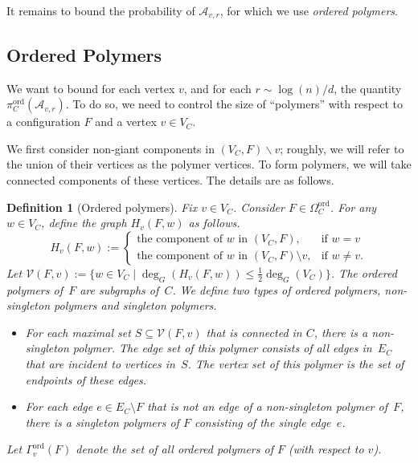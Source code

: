 \documentclass[11pt]{article}
\theoremstyle{plain}
\newtheorem{definition}[theorem]{Definition}
\newcommand{\A}{\mathcal{A}}
\newcommand{\V}{\mathcal{V}}
\newcommand{\1}{\mathbb{1}}
\newcommand{\ord}{\mathrm{ord}}
\begin{document}
It remains to bound the probability of \(\A_{v,r}\), for which we use \textit{ordered polymers}.

\subsection{Ordered Polymers}

We want to bound for each vertex \(v\), and for each \(r \sim {\log (n)}/{d}\), the quantity \(\pi^\ord_C(\A_{v,r})\).
To do so, we need to control the size of ``polymers'' with respect to a configuration $F$ and a vertex $v\in V_C$.

We first consider non-giant components in $(V_C,F)\backslash v$; roughly, we will refer to the union of their vertices as the polymer vertices. To form polymers, we will take connected components of these vertices. 
The details are as follows.





\begin{definition}[Ordered polymers]\label{def:polymers}
Fix \(v\in V_C\). Consider \(F\in\Omega^\ord_C\). For any \(w\in V_C\), define the   graph $H_v(F,w)$ as follows.
    \[
    H_v(F, w) := \begin{cases}
        \text{the component of }w\text{ in }(V_C,F), & \text{if }w=v \\
        \text{the component of }w\text{ in }(V_C,F)\setminus v, & \text{if }w\neq v.
    \end{cases}\]
Let
$
    \V(F,v) := \{w \in V_C \mid \deg_G(H_v(F, w)) \leq \tfrac{1}{2}\deg_G(V_C)\}$.
The \textit{ordered polymers} of~$F$ are subgraphs of~$C$. 
We define two types of \emph{ordered polymers}, non-singleton polymers and singleton polymers.
    \begin{itemize}
        \item  
For each maximal set  \(S\subseteq\V(F,v)\)
that is connected in \(C\),
there is a \emph{non-singleton polymer}.
The edge set of this polymer consists of all edges in~$E_C$ that are incident to vertices in~$S$.
The vertex set of this polymer is the set of endpoints of these edges.
    
\item For each edge $e\in E_C\setminus F$ that is not an edge of a non-singleton polymer of~$F$, there is a
      \emph{singleton polymers} of \(F\) 
  consisting of the single edge~$e$.    
      
\end{itemize}
    Let \(\Gamma^\ord_v(F)\) denote the set of all ordered polymers of \(F\) (with respect to $v$).

\end{definition}
\end{document}
